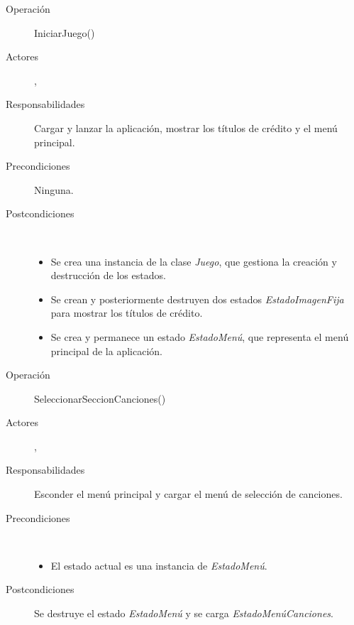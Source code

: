 \begin{description}
\item[Operación] IniciarJuego()
\item[Actores] \jugador, \sistema
\item[Responsabilidades] Cargar y lanzar la aplicación, mostrar los títulos de
  crédito y el menú principal.
\item[Precondiciones] Ninguna.
\item[Postcondiciones] $\quad$

  \begin{itemize}
  \item Se crea una instancia de la clase \textit{Juego}, que gestiona la
    creación y destrucción de los estados.
  \item Se crean y posteriormente destruyen dos estados
    \textit{EstadoImagenFija} para mostrar los títulos de crédito.
  \item Se crea y permanece un estado \textit{EstadoMenú}, que representa el
    menú principal de la aplicación.
  \end{itemize}

\end{description}

\begin{description}
\item[Operación] SeleccionarSeccionCanciones()
\item[Actores] \jugador, \sistema
\item[Responsabilidades] Esconder el menú principal y cargar el menú de
  selección de canciones.
\item[Precondiciones] $\quad$

  \begin{itemize}
  \item El estado actual es una instancia de \textit{EstadoMenú}.
  \end{itemize}

\item[Postcondiciones] Se destruye el estado \textit{EstadoMenú} y se carga
  \textit{EstadoMenúCanciones}.
\end{description}

